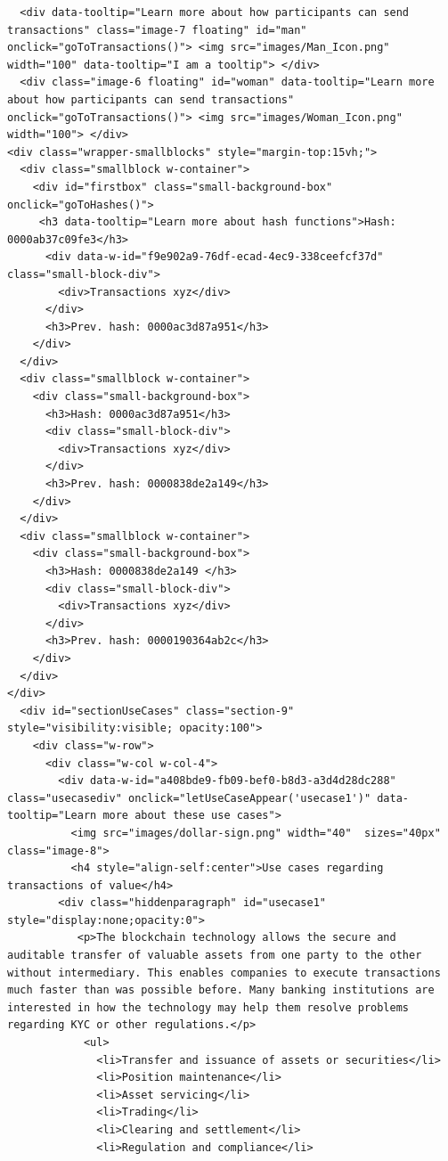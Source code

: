\begin{lstlisting}
  <div data-tooltip="Learn more about how participants can send transactions" class="image-7 floating" id="man"  onclick="goToTransactions()"> <img src="images/Man_Icon.png" width="100" data-tooltip="I am a tooltip"> </div>
  <div class="image-6 floating" id="woman" data-tooltip="Learn more about how participants can send transactions" onclick="goToTransactions()"> <img src="images/Woman_Icon.png" width="100"> </div>
<div class="wrapper-smallblocks" style="margin-top:15vh;">
  <div class="smallblock w-container">
    <div id="firstbox" class="small-background-box" onclick="goToHashes()">
     <h3 data-tooltip="Learn more about hash functions">Hash: 0000ab37c09fe3</h3>
      <div data-w-id="f9e902a9-76df-ecad-4ec9-338ceefcf37d" class="small-block-div">
        <div>Transactions xyz</div>
      </div>
      <h3>Prev. hash: 0000ac3d87a951</h3>
    </div>
  </div>
  <div class="smallblock w-container">
    <div class="small-background-box">
      <h3>Hash: 0000ac3d87a951</h3>
      <div class="small-block-div">
        <div>Transactions xyz</div>
      </div>
      <h3>Prev. hash: 0000838de2a149</h3>
    </div>
  </div>
  <div class="smallblock w-container">
    <div class="small-background-box">
      <h3>Hash: 0000838de2a149 </h3>
      <div class="small-block-div">
        <div>Transactions xyz</div>
      </div>
      <h3>Prev. hash: 0000190364ab2c</h3>
    </div>
  </div>
</div>
  <div id="sectionUseCases" class="section-9" style="visibility:visible; opacity:100">
    <div class="w-row">
      <div class="w-col w-col-4">
        <div data-w-id="a408bde9-fb09-bef0-b8d3-a3d4d28dc288" class="usecasediv" onclick="letUseCaseAppear('usecase1')" data-tooltip="Learn more about these use cases">
          <img src="images/dollar-sign.png" width="40"  sizes="40px" class="image-8">
          <h4 style="align-self:center">Use cases regarding transactions of value</h4>
        <div class="hiddenparagraph" id="usecase1" style="display:none;opacity:0">
           <p>The blockchain technology allows the secure and auditable transfer of valuable assets from one party to the other without intermediary. This enables companies to execute transactions much faster than was possible before. Many banking institutions are interested in how the technology may help them resolve problems regarding KYC or other regulations.</p>
            <ul>
              <li>Transfer and issuance of assets or securities</li>
              <li>Position maintenance</li>
              <li>Asset servicing</li>
              <li>Trading</li>
              <li>Clearing and settlement</li>
              <li>Regulation and compliance</li>

\end{lstlisting}
